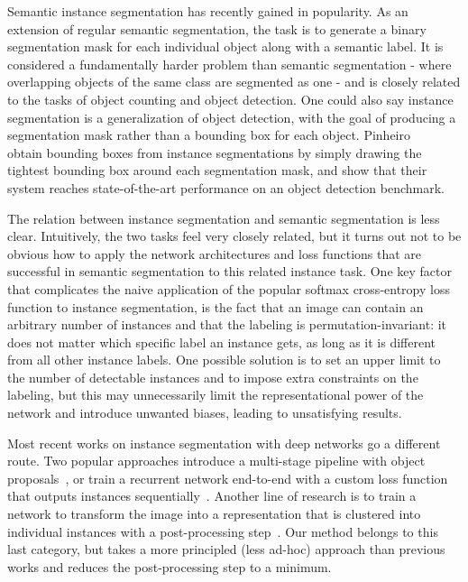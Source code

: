 \documentclass[10pt,twocolumn,letterpaper]{article}
\begin{document}
Semantic instance segmentation has recently gained in popularity. As an extension of regular semantic segmentation, the task is to generate a binary segmentation mask for each individual object along with a semantic label. It is considered a fundamentally harder problem than semantic segmentation - where overlapping objects of the same class are segmented as one - and is closely related to the tasks of object counting and object detection. One could also say instance segmentation is a generalization of object detection, with the goal of producing a segmentation mask rather than a bounding box for each object. Pinheiro~\etal~\cite{pinheiro2015learning} obtain bounding boxes from instance segmentations by simply drawing the tightest bounding box around each segmentation mask, and show that their system reaches state-of-the-art performance on an object detection benchmark.

The relation between instance segmentation and semantic segmentation is less clear. Intuitively, the two tasks feel very closely related, but it turns out not to be obvious how to apply the network architectures and loss functions that are successful in semantic segmentation to this related instance task. One key factor that complicates the naive application of the popular softmax cross-entropy loss function to instance segmentation, is the fact that an image can contain an arbitrary number of instances and that the labeling is permutation-invariant: it does not matter which specific label an instance gets, as long as it is different from all other instance labels.
One possible solution is to set an upper limit to the number of detectable instances and to impose extra constraints on the labeling, but this may unnecessarily limit the representational power of the network and introduce unwanted biases, leading to unsatisfying results.

Most recent works on instance segmentation with deep networks go a different route. Two popular approaches introduce a multi-stage pipeline with object proposals~\cite{hariharan2014simultaneous, chen2015multi, pinheiro2015learning, pinheiro2016learning, dai2015convolutional, dai2015instance, xu2016gland, arnab2016bottom}, or train a recurrent network end-to-end with a custom loss function that outputs instances sequentially~\cite{park2015learning, romera2015recurrent, ren2016end}. Another line of research is to train a network to transform the image into a representation that is clustered into individual instances with a post-processing step~\cite{silberman2014instance, zhang2015monocular, uhrig2016pixel, liang2015proposal}. Our method belongs to this last category, but takes a more principled (less ad-hoc) approach than previous works and reduces the post-processing step to a minimum.
\end{document}
